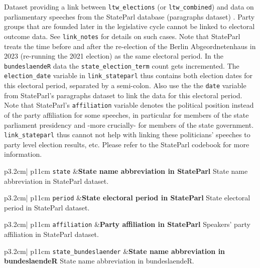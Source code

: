 \documentclass[
  a4paper,
  DIV=11,
  numbers=noendperiod]{scrartcl}
\begin{document}
Dataset providing a link between \texttt{ltw\_elections} (or
\texttt{ltw\_combined}) and data on parliamentary speeches from the
StateParl database (paragraphs dataset) \parencite{baltermann_2025}.
Party groups that are founded later in the legislative cycle cannot be
linked to electoral outcome data. See \texttt{link\_notes} for details
on such cases. Note that StateParl treats the time before and after the
re-election of the Berlin Abgeordnetenhaus in 2023 (re-running the 2021
election) as the same electoral period. In the \texttt{bundeslaendeR}
data the \texttt{state\_election\_term} count gets incremented. The
\texttt{election\_date} variable in \texttt{link\_stateparl} thus
contains both election dates for this electoral period, separated by a
semi-colon. Also use the the \texttt{date} variable from StateParl's
paragraphs dataset to link the data for this electoral period. Note that
StateParl's \texttt{affiliation} variable denotes the political position
instead of the party affiliation for some speeches, in particular for
members of the state parliament presidency and -more crucially- for
members of the state government. \texttt{link\_stateparl} thus cannot
not help with linking these politicians' speeches to party level
election results, etc. Please refer to the StateParl codebook for more
information.

\begin{longtable*}{p{3.2cm}| p{11cm}}
\texttt{state} &\textbf{State name abbreviation in StateParl}\newline 
State name abbreviation in StateParl dataset.
\end{longtable*}

\begin{longtable*}{p{3.2cm}| p{11cm}}
\texttt{period} &\textbf{State electoral period in StateParl}\newline 
State electoral period in StateParl dataset.
\end{longtable*}

\begin{longtable*}{p{3.2cm}| p{11cm}}
\texttt{affiliation} &\textbf{Party affiliation in StateParl}\newline 
Speakers' party affiliation in StateParl dataset.
\end{longtable*}

\begin{longtable*}{p{3.2cm}| p{11cm}}
\texttt{state\_bundeslaender} &\textbf{State name abbreviation in bundeslaendeR}\newline 
State name abbreviation in bundeslaendeR.
\end{longtable*}
\end{document}
